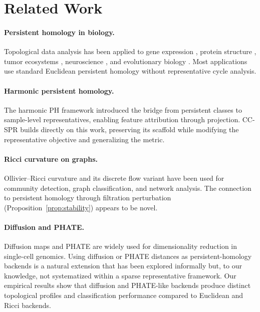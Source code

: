 \documentclass[11pt]{article}
\begin{document}
\section{Related Work}
\label{sec:related}

\paragraph{Persistent homology in biology.}
Topological data analysis has been applied to gene expression \cite{rizvi2017}, protein structure \cite{xia2014}, tumor ecosystems \cite{vipond2021}, neuroscience \cite{giusti2015}, and evolutionary biology \cite{chan2013topology}.
Most applications use standard Euclidean persistent homology without representative cycle analysis.

\paragraph{Harmonic persistent homology.}
The harmonic PH framework \cite{harmonicPH} introduced the bridge from persistent classes to sample-level representatives, enabling feature attribution through projection.
CC-SPR builds directly on this work, preserving its scaffold while modifying the representative objective and generalizing the metric.

\paragraph{Ricci curvature on graphs.}
Ollivier--Ricci curvature \cite{ollivier2007, ollivier2009} and its discrete flow variant \cite{ni2019community} have been used for community detection, graph classification, and network analysis.
The connection to persistent homology through filtration perturbation (Proposition~\ref{prop:stability}) appears to be novel.

\paragraph{Diffusion and PHATE.}
Diffusion maps \cite{coifman2006diffusion} and PHATE \cite{moon2019phate} are widely used for dimensionality reduction in single-cell genomics.
Using diffusion or PHATE distances as persistent-homology backends is a natural extension that has been explored informally but, to our knowledge, not systematized within a sparse representative framework.
Our empirical results show that diffusion and PHATE-like backends produce distinct topological profiles and classification performance compared to Euclidean and Ricci backends.
\end{document}
